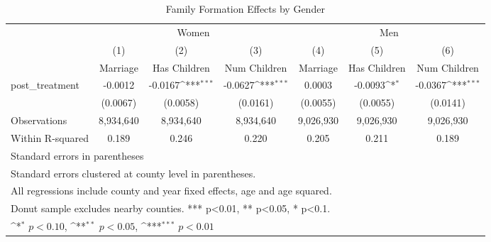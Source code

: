 \begin{table}[htbp]\centering
\def\sym#1{\ifmmode^{#1}\else\(^{#1}\)\fi}
\caption{Family Formation Effects by Gender}
\begin{tabular}{l*{6}{c}}
\hline\hline
            &\multicolumn{3}{c}{Women}                                        &\multicolumn{3}{c}{Men}                                          \\\cmidrule(lr){2-4}\cmidrule(lr){5-7}
            &\multicolumn{1}{c}{(1)}&\multicolumn{1}{c}{(2)}&\multicolumn{1}{c}{(3)}&\multicolumn{1}{c}{(4)}&\multicolumn{1}{c}{(5)}&\multicolumn{1}{c}{(6)}\\
            &\multicolumn{1}{c}{Marriage}&\multicolumn{1}{c}{Has Children}&\multicolumn{1}{c}{Num Children}&\multicolumn{1}{c}{Marriage}&\multicolumn{1}{c}{Has Children}&\multicolumn{1}{c}{Num Children}\\
\hline
post\_treatment&     -0.0012         &     -0.0167\sym{***}&     -0.0627\sym{***}&      0.0003         &     -0.0093\sym{*}  &     -0.0367\sym{***}\\
            &    (0.0067)         &    (0.0058)         &    (0.0161)         &    (0.0055)         &    (0.0055)         &    (0.0141)         \\
\hline
Observations&   8,934,640         &   8,934,640         &   8,934,640         &   9,026,930         &   9,026,930         &   9,026,930         \\
Within R-squared&       0.189         &       0.246         &       0.220         &       0.205         &       0.211         &       0.189         \\
\hline\hline
\multicolumn{7}{l}{\footnotesize Standard errors in parentheses}\\
\multicolumn{7}{l}{\footnotesize Standard errors clustered at county level in parentheses.}\\
\multicolumn{7}{l}{\footnotesize All regressions include county and year fixed effects, age and age squared.}\\
\multicolumn{7}{l}{\footnotesize Donut sample excludes nearby counties. *** p<0.01, ** p<0.05, * p<0.1.}\\
\multicolumn{7}{l}{\footnotesize \sym{*} \(p<0.10\), \sym{**} \(p<0.05\), \sym{***} \(p<0.01\)}\\
\end{tabular}
\end{table}
